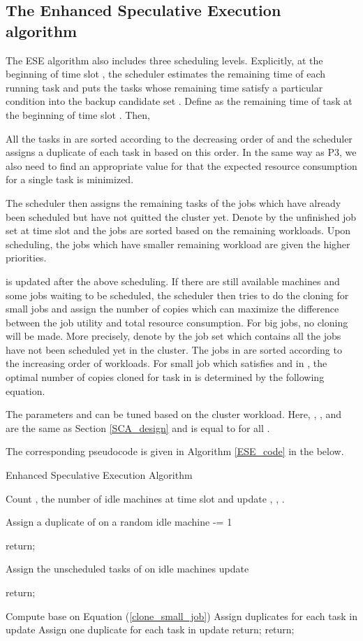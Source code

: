 \documentclass[10pt,conference]{IEEEtran}
\begin{document}
\subsection{The Enhanced Speculative Execution algorithm}
The ESE algorithm also includes three scheduling levels. Explicitly, at the beginning of time slot ,  the scheduler estimates the remaining time of each running task and puts the tasks whose remaining time satisfy a particular condition into the backup candidate set . Define  as the remaining time of task  at the beginning of time slot . Then,

All the tasks in  are sorted according to the decreasing order of   and the scheduler assigns  a duplicate of each task  in  based on this order.  In the same way as P3, we also need to find an appropriate value for  that the expected resource consumption for a single task is minimized.


The scheduler then assigns the remaining tasks of the jobs which have already been scheduled  but have not quitted the cluster yet. Denote by  the unfinished job set at time slot  and the jobs are sorted based on the remaining workloads. Upon scheduling, the jobs which have smaller remaining workload are given the higher priorities.


 is updated after the above scheduling. If there are still available machines and some jobs waiting to be scheduled, the scheduler then tries to do the cloning for small jobs and assign the number of copies which can maximize the difference between the job utility and total resource consumption. For big jobs, no cloning will be made. More precisely, denote by  the job set which contains all the jobs have not been scheduled yet in the cluster. The jobs in  are sorted according to the increasing order of workloads. For small job   which satisfies  and  in , the optimal number of copies cloned for task in  is determined by the following equation.

The parameters  and  can be tuned based on the cluster workload. Here, , ,  and  are the same as Section \ref{SCA_design} and  is equal to  for all .

The corresponding pseudocode is given in Algorithm \ref{ESE_code} in the below.

\IncMargin{1em}
\begin{algorithm}
\label{ESE_code}
\caption{Enhanced Speculative Execution Algorithm}
\Indm
{}
\Indp
Count , the number of idle machines at time slot  and update , , .

{
Assign a duplicate of   on a random idle machine\;
 -= 1\;

\If{ }
{
return;
}
}
{
Assign the unscheduled tasks of  on idle machines\;
update \;

\If{ }
{
return;
}
}
{
\eIf{ \& }
{
Compute  base on Equation (\ref{clone_small_job})\;
Assign  duplicates for each task in \;
update \;
}
{
Assign one duplicate for each task in \;
update \;
}
\If{ }
{
return;
}
}
return;
\end{algorithm}
\vspace{-0.3em}
\DecMargin{1em}
\end{document}

